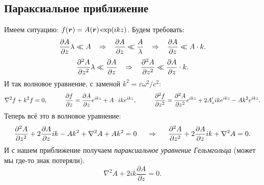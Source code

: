 \subsection*{Параксиальное приближение}
Имеем ситуацию: $f (\mbox{\boldmath $r$}) = A (\mbox{\boldmath $r$}) \exp(i k z)$. Будем требовать:
\begin{equation*}
	\frac{\partial A}{\partial z}\lambda \ll A 
	\hspace{0.3 cm}
	\Rightarrow
	\hspace{0.3 cm}
	\frac{\partial A}{\partial z} \ll \frac{A}{\lambda}
	\hspace{0.3 cm}
	\Rightarrow
	\hspace{0.3 cm}
	\frac{\partial A}{\partial z} \ll A \cdot k.
\end{equation*}
\begin{equation*}
	\frac{\partial^2 A}{\partial z^2}\lambda \ll \frac{\partial A}{\partial z} 
	\hspace{0.3 cm}
	\Rightarrow
	\hspace{0.3 cm}
	\frac{\partial^2 A}{\partial z^2} \ll \frac{\partial A}{\partial z} \cdot k.
\end{equation*}
И так волновое уравнение, с заменой $k^2 = \varepsilon \omega^2/c^2$:
\begin{equation*}
	\nabla^2 f + k^2 f  = 0,
	\hspace{0.5 cm}
	\hspace{0.5 cm}
	\frac{\partial f}{\partial z} = \frac{\partial A}{\partial z} e^{i k z} + A \cdot i k e^{i k z},
	\hspace{0.5 cm}
	\hspace{0.5 cm}
	\frac{\partial^2 f}{\partial z^2} = \frac{\partial^2 A}{\partial z^2} e^{i k z} + 2 A_z' i k e^{i k z} - A k^2 e^{i k z}.
\end{equation*}
Теперь всё это в волновое уравнение:
\begin{equation*}
	\frac{\partial^2 A}{\partial z^2} + 2 \frac{\partial A}{\partial z} i k - A k^2 + \nabla^2 A + A k^2 = 0
	\hspace{0.5 cm}
	\Rightarrow
	\hspace{0.5 cm}
	\frac{\partial^2 A}{\partial z^2} + 2 \frac{\partial A}{\partial z} i k + \nabla^2 A  = 0.
\end{equation*}
И с нашем приближение получаем \textit{параксиальное уравнение Гельмгольца} (может мы где-то знак потеряли).
\begin{equation}
 	\nabla^2 A + 2 i k \frac{\partial A}{\partial z} = 0.
 	\label{parax_helm}
 \end{equation}
